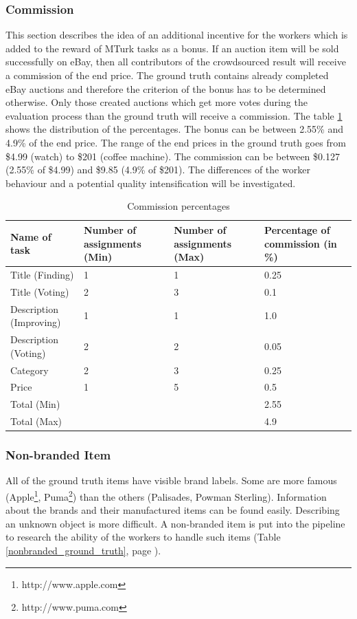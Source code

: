 \subsubsection{Commission}
This section describes the idea of an additional incentive for the workers which is added to the reward of MTurk tasks as a bonus. If an auction item will be sold successfully on eBay, then all contributors of the crowdsourced result will receive a commission of the end price. The ground truth contains already completed eBay auctions and therefore the criterion of the bonus has to be determined otherwise. Only those created auctions which get more votes during the evaluation process than the ground truth will receive a commission. The table \ref{comm_perc} shows the distribution of the percentages. The bonus can be between 2.55\% and 4.9\% of the end price. The range of the end prices in the ground truth goes from \$4.99 (watch) to \$201 (coffee machine). The commission can be between \$0.127 (2.55\% of \$4.99) and \$9.85 (4.9\% of \$201). The differences of the worker behaviour and a potential quality intensification will be investigated. 
\begin{table}[h!]
	\begin{center}
	\begin{tabular}{| p{3.25cm} | p{3.25cm} | p{3.25cm} | p{3.25cm} |}
		\hline
		\textbf{Name of task} & \textbf{Number of assignments (Min)} & \textbf{Number of assignments (Max)} & \textbf{Percentage of commission (in \%)} \\
		\hline
		Title (Finding) & 1 & 1 & 0.25 \\
		\hline
		Title (Voting) & 2 & 3 & 0.1 \\
		\hline
		Description (Improving) & 1 & 1 & 1.0 \\
		\hline
		Description (Voting) & 2 & 2 & 0.05 \\
		\hline
		Category & 2 & 3 & 0.25 \\
		\hline
		Price & 1 & 5 & 0.5 \\
		\hline \hline
		Total (Min) & & & 2.55 \\
		\hline
		Total (Max) & & & 4.9 \\
		\hline
	\end{tabular}
	\end{center}
	\caption{Commission percentages}
	\label{comm_perc}
\end{table}

\subsubsection{Non-branded Item}
All of the ground truth items have visible brand labels. Some are more famous (Apple\footnote{http://www.apple.com}, Puma\footnote{http://www.puma.com}) than the others (Palisades, Powman Sterling). Information about the brands and their manufactured items can be found easily. Describing an unknown object is more difficult. A non-branded item is put into the pipeline to research the ability of the workers to handle such items (Table \ref{nonbranded_ground_truth}, page \pageref{nonbranded_ground_truth}). 


